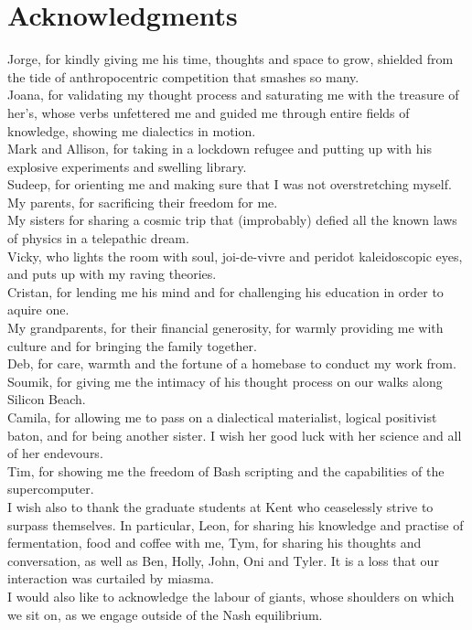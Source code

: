 \chapter*{Acknowledgments}

Jorge, for kindly giving me his time, thoughts and space to grow, shielded from the tide of 
anthropocentric competition that smashes so many.\\
Joana, for validating my thought process and saturating me with the treasure of 
her's, whose verbs unfettered me and guided me through entire fields of knowledge, 
showing me dialectics in motion.\\
Mark and Allison, for taking in a lockdown refugee and putting up with his 
explosive experiments and swelling library.\\
Sudeep, for orienting me and making sure that I was not overstretching myself.\\
My parents, for sacrificing their freedom for me.\\
My sisters for sharing a cosmic trip that (improbably) defied all the known laws of 
physics in a telepathic dream.\\
Vicky, who lights the room with soul, joi-de-vivre and peridot kaleidoscopic eyes, 
and puts up with my raving theories.\\
Cristan, for lending me his mind and for challenging his 
education in order to aquire one.\\
My grandparents, for their financial generosity, for warmly providing me with culture 
and for bringing the family together.\\
Deb, for care, warmth and the fortune of a homebase to conduct my work from.\\
Soumik, for giving me the intimacy of his thought process on our walks along Silicon 
Beach.\\
Camila, for allowing me to pass on a dialectical materialist, logical positivist 
baton, and for being another sister. I wish her good luck with her science and all of 
her endevours.\\
Tim, for showing me the freedom of Bash scripting and the capabilities of the 
supercomputer.\\
I wish also to thank the graduate students at Kent who ceaselessly strive to surpass
themselves. In particular, Leon, for sharing his knowledge and practise of fermentation,
food and coffee with me, Tym, for sharing his thoughts and conversation, as well as 
Ben, Holly, John, Oni and Tyler. 
It is a loss that our interaction was curtailed by miasma.\\
I would also like to acknowledge the labour of giants, whose shoulders on which we sit on, as
we engage outside of the Nash equilibrium.
